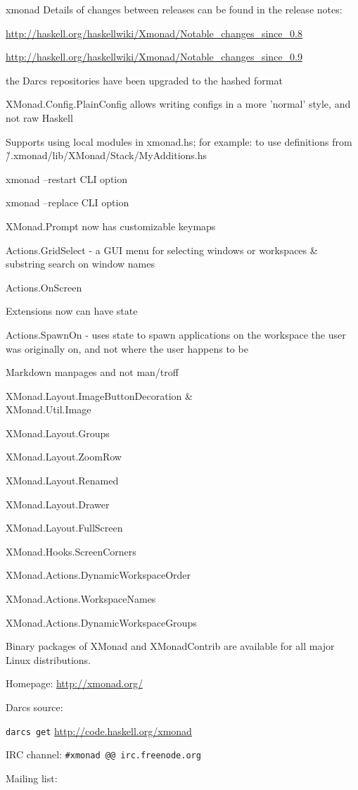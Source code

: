 \begin{hcarentry}{xmonad}
Details of changes between releases can be found in the release notes:
\begin{compactitem}
\item \url{http://haskell.org/haskellwiki/Xmonad/Notable_changes_since_0.8}
\item \url{http://haskell.org/haskellwiki/Xmonad/Notable_changes_since_0.9}
\item the Darcs repositories have been upgraded to the hashed format
\item XMonad.Config.PlainConfig allows writing configs in a more 'normal' style, and not raw Haskell
\item Supports using local modules in xmonad.hs; for example: to use definitions from \~/.xmonad/lib/XMonad/Stack/MyAdditions.hs
\item xmonad --restart CLI option
\item xmonad --replace CLI option
\item XMonad.Prompt now has customizable keymaps
\item Actions.GridSelect - a GUI menu for selecting windows or workspaces \& substring search on window names
\item Actions.OnScreen
\item Extensions now can have state
\item Actions.SpawnOn - uses state to spawn applications on the workspace the user was originally on,
  and not where the user happens to be
\item Markdown manpages and not man/troff
\item  XMonad.Layout.ImageButtonDecoration \&\\ XMonad.Util.Image
\item XMonad.Layout.Groups
\item XMonad.Layout.ZoomRow
\item XMonad.Layout.Renamed
\item XMonad.Layout.Drawer
\item XMonad.Layout.FullScreen
\item XMonad.Hooks.ScreenCorners
\item XMonad.Actions.DynamicWorkspaceOrder
\item XMonad.Actions.WorkspaceNames
\item XMonad.Actions.DynamicWorkspaceGroups
\end{compactitem}

Binary packages of XMonad and XMonadContrib are available for all major Linux distributions.

\FurtherReading
\begin{compactitem}
\item Homepage:
 \url{http://xmonad.org/}

\item Darcs source:

 \texttt{darcs get} \url{http://code.haskell.org/xmonad}

\item IRC channel:
 \verb+#xmonad @@ irc.freenode.org+

\item Mailing list:
\end{compactitem}
\end{hcarentry}
